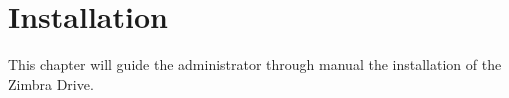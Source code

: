 \chapter{Installation}\label{cha:installation}

This chapter will guide the administrator through manual the installation of the Zimbra Drive.



